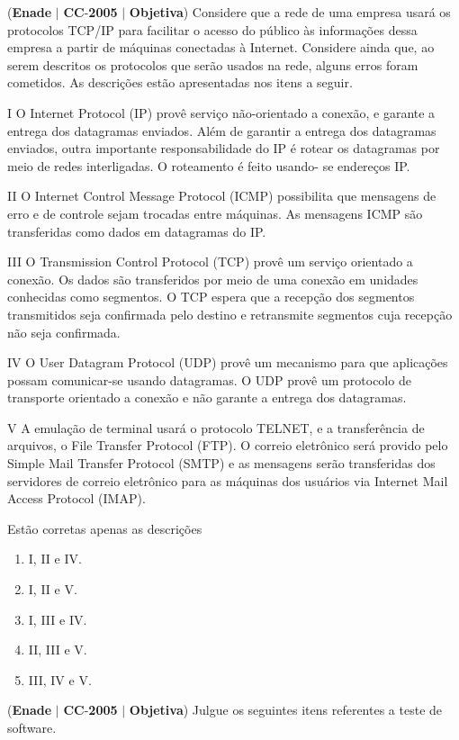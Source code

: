\documentclass{exam}
\begin{document}
\begin{questions}
\question (\textbf{Enade} $|$ \textbf{CC}-\textbf{2005} $|$ \textbf{Objetiva})
Considere que a rede de uma empresa usará os protocolos
TCP/IP para facilitar o acesso do público às informações dessa
empresa a partir de máquinas conectadas à Internet. Considere
ainda que, ao serem descritos os protocolos que serão usados na
rede, alguns erros foram cometidos. As descrições estão
apresentadas nos itens a seguir.

I O Internet Protocol (IP) provê serviço não-orientado a
conexão, e garante a entrega dos datagramas enviados. Além
de garantir a entrega dos datagramas enviados, outra
importante responsabilidade do IP é rotear os datagramas
por meio de redes interligadas. O roteamento é feito usando-
se endereços IP.

II O Internet Control Message Protocol (ICMP) possibilita
que mensagens de erro e de controle sejam trocadas entre
máquinas. As mensagens ICMP são transferidas como dados
em datagramas do IP.

III O Transmission Control Protocol (TCP) provê um serviço
orientado a conexão. Os dados são transferidos por meio de
uma conexão em unidades conhecidas como segmentos.
O TCP espera que a recepção dos segmentos transmitidos
seja confirmada pelo destino e retransmite segmentos cuja
recepção não seja confirmada.

IV O User Datagram Protocol (UDP) provê um mecanismo
para que aplicações possam comunicar-se usando
datagramas. O UDP provê um protocolo de transporte
orientado a conexão e não garante a entrega dos datagramas.

V A emulação de terminal usará o protocolo TELNET, e a
transferência de arquivos, o File Transfer Protocol (FTP).
O correio eletrônico será provido pelo Simple Mail Transfer
Protocol (SMTP) e as mensagens serão transferidas dos
servidores de correio eletrônico para as máquinas dos
usuários via Internet Mail Access Protocol (IMAP).

Estão corretas apenas as descrições
	\begin{enumerate}[label=\alph*)]
		\item  I, II e IV. 
		\item  I, II e V. 
		\item  I, III e IV.
		\item  II, III e V.
		\item  III, IV e V.
	\end{enumerate}

\question (\textbf{Enade} $|$ \textbf{CC}-\textbf{2005} $|$ \textbf{Objetiva})
Julgue os seguintes itens referentes a teste de software.


\end{questions}
\end{document}
